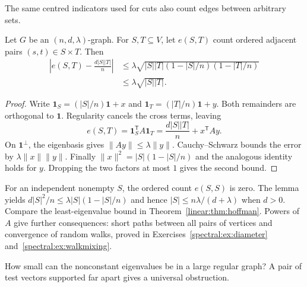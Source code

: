 The same centred indicators used for cuts also count edges between arbitrary sets.

\begin{lemma}\label{spectral:lem:mixing}
Let $G$ be an $(n,d,\lambda)$-graph. For $S,T\subseteq V$, let $e(S,T)$ count ordered adjacent pairs $(s,t)\in S\times T$. Then
\[
\begin{aligned}
\left|e(S,T)-\frac{d|S||T|}{n}\right|
&\le\lambda\sqrt{|S||T|(1-|S|/n)(1-|T|/n)}\\
&\le\lambda\sqrt{|S||T|}.
\end{aligned}
\]
\end{lemma}
\begin{proof}
Write $\mathbf1_S=(|S|/n)\mathbf1+x$ and $\mathbf1_T=(|T|/n)\mathbf1+y$. Both remainders are orthogonal to $\mathbf1$. Regularity cancels the cross terms, leaving
\[
e(S,T)=\mathbf1_S^{\mathsf T}A\mathbf1_T
=\frac{d|S||T|}{n}+x^{\mathsf T}Ay.
\]
On $\mathbf1^\perp$, the eigenbasis gives $\|Ay\|\le\lambda\|y\|$. Cauchy--Schwarz bounds the error by $\lambda\|x\|\|y\|$. Finally $\|x\|^2=|S|(1-|S|/n)$ and the analogous identity holds for $y$. Dropping the two factors at most $1$ gives the second bound.
\end{proof}

For an independent nonempty $S$, the ordered count $e(S,S)$ is zero. The lemma yields $d|S|^2/n\le\lambda|S|(1-|S|/n)$ and hence $|S|\le n\lambda/(d+\lambda)$ when $d>0$. Compare the least-eigenvalue bound in Theorem~\ref{linear:thm:hoffman}. Powers of $A$ give further consequences: short paths between all pairs of vertices and convergence of random walks, proved in Exercises~\ref{spectral:ex:diameter} and~\ref{spectral:ex:walkmixing}.

How small can the nonconstant eigenvalues be in a large regular graph? A pair of test vectors supported far apart gives a universal obstruction.

